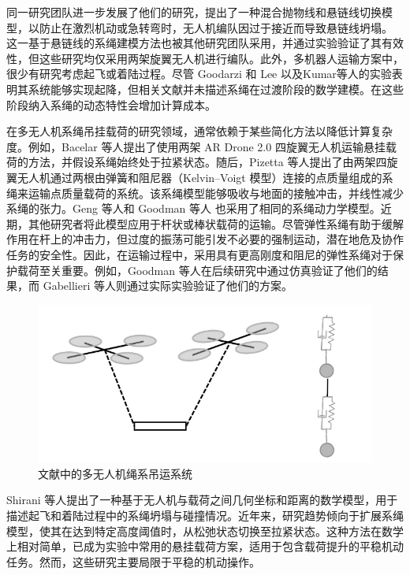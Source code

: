 \documentclass[lang=chs, degree=master, blindreview=false, winfonts=true]{yanputhesis}
\begin{document}
同一研究团队进一步发展了他们的研究，提出了一种混合抛物线和悬链线切换模型，以防止在激烈机动或急转弯时，无人机编队因过于接近而导致悬链线坍塌。 \cite{estevez2022hybrid}
这一基于悬链线的系绳建模方法也被其他研究团队采用，并通过实验验证了其有效性\cite{d2021catenary,abhishek2021towards}，但这些研究均仅采用两架旋翼无人机进行编队。此外，多机器人运输方案中，很少有研究考虑起飞或着陆过程。尽管 Goodarzi 和 Lee \cite{goodarzi2015dynamics} 以及Kumar等人\cite{michael2011cooperative}的实验表明其系统能够实现起降，但相关文献并未描述系绳在过渡阶段的数学建模。在这些阶段纳入系绳的动态特性会增加计算成本。

在多无人机系绳吊挂载荷的研究领域，通常依赖于某些简化方法以降低计算复杂度。例如，Bacelar 等人提出了使用两架 AR Drone 2.0 四旋翼无人机运输悬挂载荷的方法，并假设系绳始终处于拉紧状态\cite{bacelar2020board}。随后，Pizetta 等人提出了由两架四旋翼无人机通过两根由弹簧和阻尼器（Kelvin–Voigt 模型）连接的点质量组成的系绳来运输点质量载荷的系统\cite{doakhan2023cooperative,doakhan2023robust}。该系绳模型能够吸收与地面的接触冲击，并线性减少系绳的张力。Geng 等人\cite{geng2020cooperative}和 Goodman 等人\cite{goodman2023geometric} 也采用了相同的系绳动力学模型。近期，其他研究者将此模型应用于杆状或棒状载荷的运输。尽管弹性系绳有助于缓解作用在杆上的冲击力，但过度的振荡可能引发不必要的强制运动，潜在地危及协作任务的安全性。因此，在运输过程中，采用具有更高刚度和阻尼的弹性系绳对于保护载荷至关重要。例如，Goodman 等人\cite{goodman2022geometric}在后续研究中通过仿真验证了他们的结果，而 Gabellieri 等人则通过实际实验验证了他们的方案\cite{gabellieri2023equilibria}。

\begin{figure}[hbt!]
	\centering
	\includegraphics[width=28pc]{picture/1_8.png} 
	\caption{文献中的多无人机绳系吊运系统} \label{1_8}
\end{figure}
Shirani 等人提出了一种基于无人机与载荷之间几何坐标和距离的数学模型，用于描述起飞和着陆过程中的系绳坍塌与碰撞情况\cite{shirani2019cooperative}。近年来，研究趋势倾向于扩展系绳模型，使其在达到特定高度阈值时，从松弛状态切换至拉紧状态\cite{rao2023integrated,arab2022cooperative,doakhan2023robust,mohammadi2021passivity}。这种方法在数学上相对简单，已成为实验中常用的悬挂载荷方案，适用于包含载荷提升的平稳机动任务。然而，这些研究主要局限于平稳的机动操作。
\end{document}
